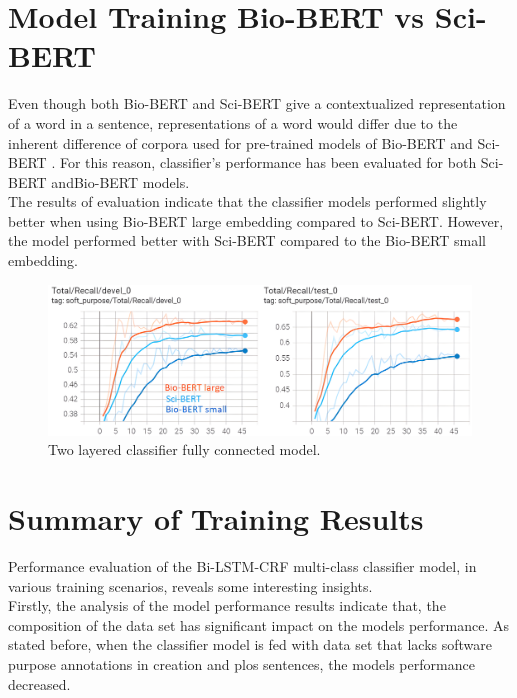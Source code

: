 \section{Model Training Bio-BERT vs Sci-BERT}
\label{sec:chapter06:biosci}

Even though both \ac{Bio-BERT} and \ac{Sci-BERT} give a contextualized representation of a word in a sentence, representations of a word would differ due to the inherent difference of corpora used for pre-trained models of \ac{Bio-BERT} and \ac{Sci-BERT} \citep{beltagy2019scibert,li2019fine}. For this reason, classifier’s performance has been evaluated for both \ac{Sci-BERT} and\ac{Bio-BERT} models. \\

The results of evaluation indicate that the classifier models performed slightly better when using \ac{Bio-BERT} large embedding compared to \ac{Sci-BERT}. However, the model performed better with \ac{Sci-BERT} compared to the \ac{Bio-BERT} small embedding. 

\begin{figure}[htbp]
	\centering
	\includegraphics[width=.90\textwidth]{4.graphics/figures/ch_6/6.BIoBERT_vs_SCIBERT_2LAYER_Classifier/HD/1}
	\caption{Two layered classifier fully connected model.}
	\label{fig:chapter06:with}
\end{figure}

\section{Summary of Training Results }
\label{sec:chapter06:summary}

Performance evaluation of the Bi-LSTM-CRF multi-class classifier model, in various training scenarios, reveals some interesting insights. \\

Firstly, the analysis of the model performance results indicate that, the composition of the data set has significant impact on the models performance. As stated before, when the classifier model is fed with data set that lacks software purpose annotations in creation and plos sentences, the models performance decreased. \\

